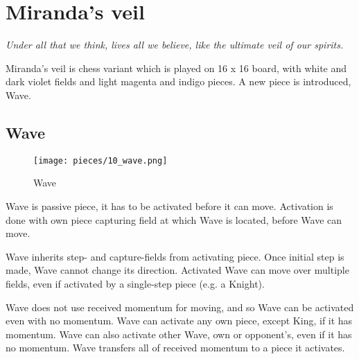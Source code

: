 

\chapter*{Miranda's veil}
\label{ch:Miranda's veil}

\begin{flushright}
\parbox{0.8\textwidth}{
\emph{Under all that we think, lives all we believe, like the ultimate veil of our spirits.\newline
{} } }
\end{flushright}

\noindent
Miranda's veil is chess variant which is played on 16 x 16 board, with
white and dark violet fields and light magenta and indigo pieces.
A new piece is introduced, Wave.

\clearpage %

\section*{Wave}
\label{sec:Miranda's veil/Wave}

\vspace*{-1.4\baselineskip}
\noindent
\begin{wrapfigure}[11]{l}{0.4\textwidth}
\centering
\texttt{[image: pieces/10\_wave.png]}
\caption{Wave}
\label{fig:10_wave}
\end{wrapfigure}
Wave is passive piece, it has to be activated before it can move. Activation is done
with own piece capturing field at which Wave is located, before Wave can move.

Wave inherits step- and capture-fields from activating piece. Once initial step is
made, Wave cannot change its direction. Activated Wave can move over multiple fields,
even if activated by a single-step piece (e.g. a Knight).

Wave does not use received momentum for moving, and so Wave can be activated even
with no momentum. Wave can activate any own piece, except King, if it has momentum.
Wave can also activate other Wave, own or opponent's, even if it has no momentum.
Wave transfers all of received momentum to a piece it activates.

